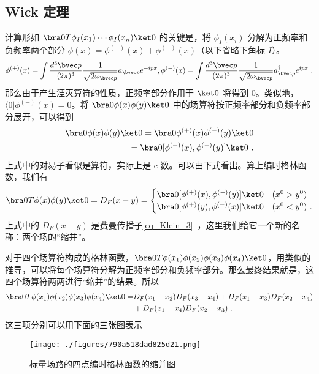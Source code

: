 \subsection{Wick 定理}
计算形如 $\bra 0 T\phi_I(x_1)\cdots\phi_I(x_n) \ket 0$ 的关键是，将 $\phi_I(x_i)$ 分解为正频率和负频率两个部分 $\phi( x)=\phi^{(+)}( x)+\phi^{(-)}( x)$（以下省略下角标 $I$）。
\begin{equation}
\phi^{(+)}( x) = \int \frac{d{}^3{\bvec p}}{(2\pi)^3} \frac{1}{\sqrt{2\omega_{\bvec p}}}a_{\bvec p} e^{-ipx} ,
\phi^{(-)}( x) = \int \frac{d{}^3{\bvec p}}{(2\pi)^3} \frac{1}{\sqrt{2\omega_{\bvec p}}}a_{\bvec p}^\dagger e^{ipx} ~.
\end{equation}
那么由于产生湮灭算符的性质，正频率部分作用于 $\ket 0$ 将得到 $0$。类似地，$\langle 0| \phi^{(-)}( x)=0$。将 $\bra 0 \phi(x)\phi(y)\ket 0$ 中的场算符按正频率部分和负频率部分展开，可以得到
\begin{equation}
\begin{aligned}
\bra 0 \phi( x)\phi( y)\ket 0=\bra 0 \phi^{(+)}( x)\phi^{(-)}( y)\ket 0\\
 = \bra 0[\phi^{(+)}( x),\phi^{(-)}( y)]\ket 0~.
\end{aligned}
\end{equation}
上式中的对易子看似是算符，实际上是 c 数。可以由下式看出。算上编时格林函数，我们有
\begin{equation}
\bra 0 T\phi( x)\phi( y)\ket 0=D_F(x-y)=\begin{cases}
\bra 0[\phi^{(+)}( x),\phi^{(-)}( y)]\ket 0 & (x^0>y^0)\\
\bra 0[\phi^{(+)}( y),\phi^{(-)}( x)]\ket 0 & (x^0<y^0)~.
\end{cases}
\end{equation}
上式中的 $D_F(x-y)$ 是费曼传播子\autoref{eq_Klein_3}~，这里我们给它一个新的名称：两个场的“缩并”。

对于四个场算符构成的格林函数，$\bra 0 T\phi(x_1)\phi(x_2)\phi(x_3)\phi(x_4)\ket 0$，用类似的推导，可以将每个场算符分解为正频率部分和负频率部分。那么最终结果就是，这四个场算符两两进行“缩并”的结果。所以
\begin{equation}
\begin{aligned}
\bra 0 T\phi(x_1)\phi(x_2)\phi(x_3)\phi(x_4)\ket 0=&D_F(x_1-x_2)D_F(x_3-x_4)+D_F(x_1-x_3)D_F(x_2-x_4)
\\&+D_F(x_1-x_4)D_F(x_2-x_3)~.
\end{aligned}
\end{equation}
这三项分别可以用下面的三张图表示
\begin{figure}[ht]
\centering
\texttt{[image: ./figures/790a518dad825d21.png]}
\caption{标量场路的四点编时格林函数的缩并图} \label{fig_wick_1}
\end{figure}

